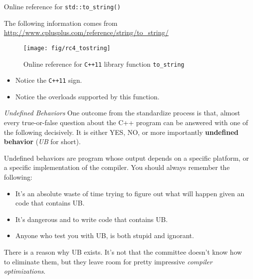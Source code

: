 \begin{frame}{Online reference for \texttt{std::to\_string()}}

The following information comes from \url{http://www.cplusplus.com/reference/string/to\_string/}

\begin{figure}
	\centering
	\texttt{[image: fig/rc4\_tostring]}
	\caption{Online reference for \texttt{C++11} library function \texttt{to\_string}}
	\vspace{-0.2in}
\end{figure}

\begin{itemize}
	\item Notice the \texttt{C++11} sign.
	\item Notice the overloads supported by this function.
\end{itemize}
\end{frame}

\begin{frame}{\textit{Undefined Behaviors}}
One outcome from the standardize process is that, almost every true-or-false question about the C++ program can be answered with one of the following decisively. It is either YES, NO, or more importantly \textbf{undefined behavior} (\textit{UB} for short).

Undefined behaviors are program whose output depends on a specific platform, or a specific implementation of the compiler. You should always remember the following:
\begin{itemize}
	\item It's an absolute waste of time trying to figure out what will happen given an code that contains UB.
	\item It's dangerous and to write code that contains UB.
	\item Anyone who test you with UB, is both stupid and ignorant.
\end{itemize}

There is a reason why UB exists. It's not that the committee doesn't know how to eliminate them, but they leave room for pretty impressive \textit{compiler optimizations}.
\end{frame}

